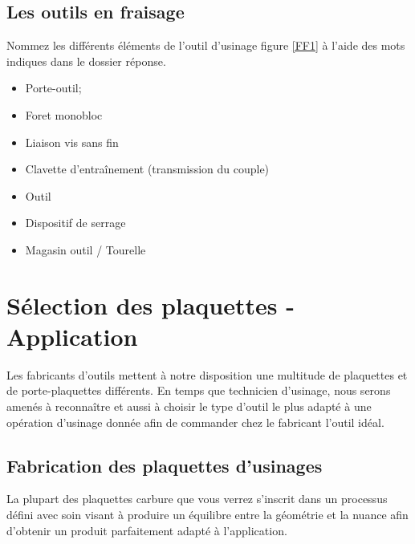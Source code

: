 \documentclass[12pt]{article}
\newcounter{exo}
\newenvironment{exo}{\stepcounter{exo}\vspace{0.5cm}{\bfseries Question \theexo\ :}}{\par\vspace{0.5cm}}
\begin{document}
\subsection{Les outils en fraisage}


\begin{exo} Nommez les différents éléments de l’outil d’usinage figure \ref{FF1} à l'aide des mots
indiques dans le dossier réponse. \end{exo}



\begin{minipage}{.55\linewidth}
\begin{itemize}
    \item Porte-outil;
    \item Foret monobloc
    \item Liaison vis sans fin
    \item Clavette d'entraînement (transmission du couple)
\end{itemize} 
\end{minipage}
\begin{minipage}{.44\linewidth}
\begin{itemize}
    \item Outil
    \item Dispositif de serrage
    \item Magasin outil / Tourelle
\end{itemize} 
\end{minipage}


\section{Sélection des plaquettes - Application}
Les fabricants d’outils mettent à notre disposition une multitude de plaquettes et de porte-plaquettes différents. En temps que technicien d’usinage, nous serons amenés à reconnaître et aussi à choisir le type d’outil le plus adapté à une opération d’usinage donnée afin de commander chez le fabricant l’outil idéal.


\subsection{Fabrication des plaquettes d'usinages}
La plupart des plaquettes carbure que vous verrez s'inscrit dans un processus défini avec soin visant à produire un équilibre entre la géométrie et la nuance afin d'obtenir un produit parfaitement adapté à l'application.
\end{document}
